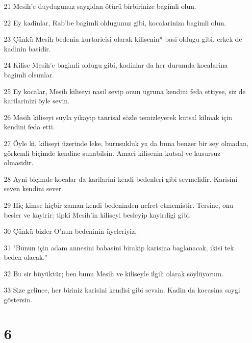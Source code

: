 \par 21 Mesih'e duydugunuz saygidan ötürü birbirinize bagimli olun.
\par 22 Ey kadinlar, Rab'be bagimli oldugunuz gibi, kocalariniza bagimli olun.
\par 23 Çünkü Mesih bedenin kurtaricisi olarak kilisenin* basi oldugu gibi, erkek de kadinin basidir.
\par 24 Kilise Mesih'e bagimli oldugu gibi, kadinlar da her durumda kocalarina bagimli olsunlar.
\par 25 Ey kocalar, Mesih kiliseyi nasil sevip onun ugruna kendini feda ettiyse, siz de karilarinizi öyle sevin.
\par 26 Mesih kiliseyi suyla yikayip tanrisal sözle temizleyerek kutsal kilmak için kendini feda etti.
\par 27 Öyle ki, kiliseyi üzerinde leke, burusukluk ya da buna benzer bir sey olmadan, görkemli biçimde kendine sunabilsin. Amaci kilisenin kutsal ve kusursuz olmasidir.
\par 28 Ayni biçimde kocalar da karilarini kendi bedenleri gibi sevmelidir. Karisini seven kendini sever.
\par 29 Hiç kimse hiçbir zaman kendi bedeninden nefret etmemistir. Tersine, onu besler ve kayirir; tipki Mesih'in kiliseyi besleyip kayirdigi gibi.
\par 30 Çünkü bizler O'nun bedeninin üyeleriyiz.
\par 31 "Bunun için adam annesini babasini birakip karisina baglanacak, ikisi tek beden olacak."
\par 32 Bu sir büyüktür; ben bunu Mesih ve kiliseyle ilgili olarak söylüyorum.
\par 33 Size gelince, her biriniz karisini kendisi gibi sevsin. Kadin da kocasina saygi göstersin.

\chapter{6}

